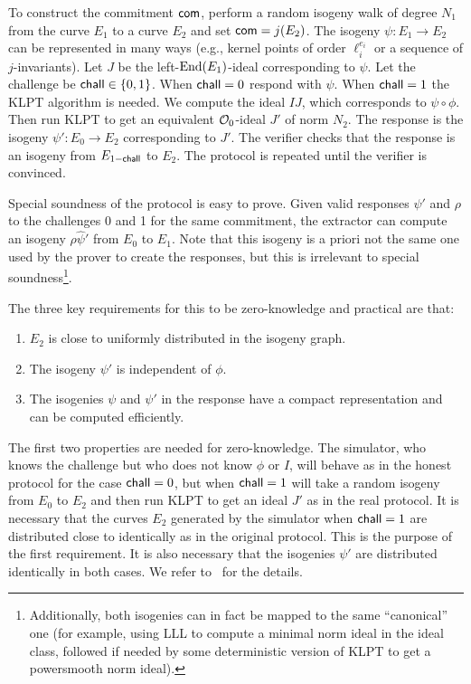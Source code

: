 To construct the commitment $\mathsf{com}$, perform a random isogeny walk of degree $N_1$ from the curve $E_1$ to a curve $E_2$ and set $\mathsf{com} = j(E_2)$.
The isogeny $\psi : E_1 \to E_2$ can be represented in many ways (e.g., kernel points of order $\ell_i^{e_i}$ or a sequence of $j$-invariants).
Let $J$ be the left-$\text{End}(E_1)$-ideal corresponding to $\psi$.
Let the challenge be $\mathsf{chall} \in \{0,1\}$.
When $\mathsf{chall}=0$ respond with $\psi$.
When $\mathsf{chall}=1$ the KLPT algorithm is needed. We compute the ideal $IJ$, which corresponds to $\psi \circ \phi$.
Then run KLPT to get an equivalent $\mathcal{O}_0$-ideal $J'$ of norm $N_2$. The response is the isogeny $\psi' : E_0 \to E_2$ corresponding to $J'$.
The verifier checks that the response is an isogeny from $E_{1-\mathsf{chall}}$ to $E_2$.
The protocol is repeated until the verifier is convinced.

Special soundness of the protocol is easy to prove. Given valid responses $\psi'$ and $\rho$ to the challenges 0 and 1 for the same commitment, the extractor can compute an isogeny $\rho\hat\psi'$ from $E_0$ to $E_1$. Note that this isogeny is a priori not the same one used by the prover  to create the responses, but this is irrelevant to special soundness\footnote{Additionally, both isogenies can in fact be mapped to the same ``canonical'' one (for example, using LLL to compute a minimal norm ideal in the ideal class, followed if needed by some deterministic version of KLPT to get a powersmooth norm ideal).}.


The three key requirements for this to be zero-knowledge and practical are that:
\begin{enumerate}
    \item $E_2$ is close to uniformly distributed in the isogeny graph.
    \item The isogeny $\psi'$ is independent of $\phi$.
    \item The isogenies $\psi$ and $\psi'$ in the response have a compact representation and can be computed efficiently.
\end{enumerate}
The first two properties are needed for zero-knowledge. 
The simulator, who knows the challenge but who does not know $\phi$ or $I$, will behave as in the honest protocol for the case $\mathsf{chall}=0$, but when $\mathsf{chall}=1$ will take a random isogeny from $E_0$ to $E_2$ and then run KLPT to get an ideal $J'$ as in the real protocol. 
It is necessary that the curves $E_2$ generated by the simulator when $\mathsf{chall}=1$ are distributed close to identically as in the original protocol. This is the purpose of the first requirement.
It is also necessary that the isogenies $\psi'$ are distributed identically in both cases.
We refer to~\cite{GPS20} for the details.


